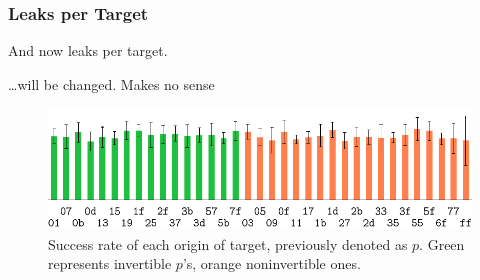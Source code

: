 
\subsubsection{Leaks per Target}
	
	And now leaks per target. %
	
	\ldots will be changed. Makes no sense
	
	\begin{figure}[h]
	\begin{center}
		\includegraphics{figures/leak_target/leak_target.pdf}
		\caption{Success rate of each origin of target, previously denoted as $p$. Green represents invertible $p$'s, orange noninvertible ones.}
		\label{fig:leaktargethist}
	\end{center}
	\end{figure}
	
